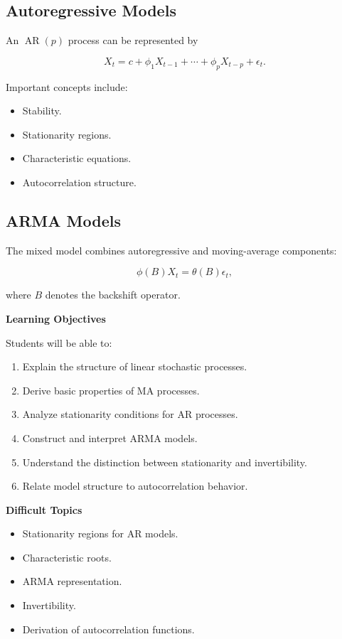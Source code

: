 \documentclass[11pt,a4paper]{article}
\newcommand{\AR}{\operatorname{AR}}
\begin{document}
\subsection{Autoregressive Models}

An $\AR(p)$ process can be represented by

\[
X_t
=
c+
\phi_1X_{t-1}
+\cdots+
\phi_pX_{t-p}
+\epsilon_t.
\]

Important concepts include:

\begin{itemize}
    \item Stability.
    \item Stationarity regions.
    \item Characteristic equations.
    \item Autocorrelation structure.
\end{itemize}

\subsection{ARMA Models}

The mixed model combines autoregressive and moving-average components:

\[
\phi(B)X_t
=
\theta(B)\epsilon_t,
\]

where $B$ denotes the backshift operator.

\textbf{Learning Objectives}

Students will be able to:

\begin{enumerate}
    \item Explain the structure of linear stochastic processes.
    \item Derive basic properties of MA processes.
    \item Analyze stationarity conditions for AR processes.
    \item Construct and interpret ARMA models.
    \item Understand the distinction between stationarity and invertibility.
    \item Relate model structure to autocorrelation behavior.
\end{enumerate}

\textbf{Difficult Topics}

\begin{itemize}
    \item Stationarity regions for AR models.
    \item Characteristic roots.
    \item ARMA representation.
    \item Invertibility.
    \item Derivation of autocorrelation functions.
\end{itemize}
\end{document}
